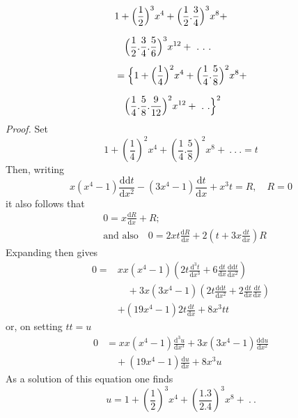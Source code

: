 \begingroup
\renewcommand{\arraystretch}{1.45}
\[
\begin{aligned}
&1+\Bigl(\frac12\Bigr)^3x^4+\Bigl(\frac12.\frac34\Bigr)^3x^8+
\\[7pt]&\quad{}\Bigl(\frac12.\frac34.\frac56\Bigr)^3x^{12}+\ .\ .\ .\\[5pt]
&=\Bigl\{1+\Bigl(\frac14\Bigr)^2x^4+\Bigl(\frac14.\frac58\Bigr)^2x^8+
\\[7pt]&\quad{}\Bigl(\frac14.\frac58.\frac9{12}\Bigr)^2x^{12}+\ .\ .\Bigr\}^2
\end{aligned}
\]
\textit{Proof.} Set
\[
1+\left(\frac14\right)^2x^4+\left(\frac14.\frac58\right)^2x^8+\ .\ .\ .=t
\]
Then, writing
\[
x(x^4-1)\frac{\mathrm{dd}t}{\mathrm dx^2}-(3x^4-1)\frac{\mathrm dt}{\mathrm dx}+x^3t=R,\quad R=0
\]
it also follows that
\[
\begin{aligned}&0=x\frac{\mathrm dR}{\mathrm dx}+R;\\[7pt]&\text{and also}\quad
0=2xt\frac{\mathrm dR}{\mathrm dx}+2\left(t+3x\frac{\mathrm dt}{\mathrm dx}\right)R\end{aligned}
\]
Expanding then gives
\[
\begin{aligned}
0={}&xx(x^4-1)\left(2t\frac{\mathrm d^3t}{\mathrm dx^3}+6\frac{\mathrm dt}{\mathrm dx}\frac{\mathrm{dd}t}{\mathrm dx^2}\right)
\\[7pt]&\quad{}+3x(3x^4-1)\left(2t\frac{\mathrm{dd}t}{\mathrm dx^2}+2\frac{\mathrm dt}{\mathrm dx}\frac{\mathrm dt}{\mathrm dx}\right)\\[5pt]
&+(19x^4-1)2t\frac{\mathrm dt}{\mathrm dx}+8x^3tt
\end{aligned}
\]
or, on setting $tt=u$
\[
\begin{aligned}0&=xx(x^4-1)\frac{\mathrm d^3u}{\mathrm dx^3}+3x(3x^4-1)\frac{\mathrm{dd}u}{\mathrm dx^2}
\\[7pt]&\quad{}+(19x^4-1)\frac{\mathrm du}{\mathrm dx}+8x^3u\end{aligned}
\]
As a solution of this equation one finds
\[
u=1+\left(\frac12\right)^3x^4+\left(\frac{1.3}{2.4}\right)^3x^8+\ .\ .
\]


